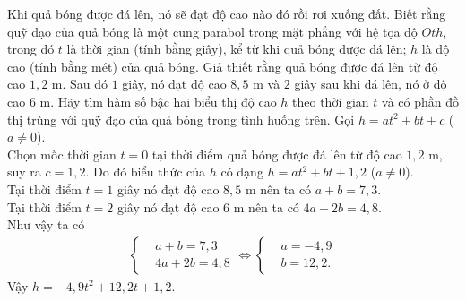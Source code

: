 \begin{vd}%
	Khi quả bóng được đá lên, nó sẽ đạt độ cao nào đó rồi rơi xuống đất. Biết rằng quỹ đạo của quả bóng là một cung parabol trong mặt phẳng với hệ tọa độ $Oth$, trong đó $t$ là thời gian (tính bằng giây), kể từ khi quả bóng được đá lên; $h$ là độ cao (tính bằng mét) của quả bóng. Giả thiết rằng quả bóng được đá lên từ độ cao $1{,}2$ m. Sau đó $1$ giây, nó đạt độ cao $8{,}5$ m và $2$ giây sau khi đá lên, nó ở độ cao $6$ m. Hãy tìm hàm số bậc hai biểu thị độ cao $h$ theo thời gian $t$ và có phần đồ thị trùng với quỹ đạo của quả bóng trong tình huống trên.
	\loigiai
	{
		Gọi $h=at^2+bt+c$ ($a\neq 0$).\\
		Chọn mốc thời gian $t=0$ tại thời điểm quả bóng được đá lên từ độ cao $1{,}2$ m, suy ra $c=1{,}2$. Do đó biểu thức của $h$ có dạng $h=at^2+bt+1{,}2$ ($a\neq 0$).\\
		Tại thời điểm $t=1$ giây nó đạt độ cao $8{,}5$ m nên ta có $a+b=7{,}3$.\\
		Tại thời điểm $t=2$ giây nó đạt độ cao $6$ m nên ta có $4a+2b=4{,}8$.\\
		Như vậy ta có
		\begin{eqnarray*}
			\left\{\begin{aligned}&a+b=7{,}3 \\&4a+2b=4{,}8\end{aligned}\right. \Leftrightarrow \left\{\begin{aligned}&a=-4{,}9 \\&b=12{,}2.  \end{aligned}\right.
		\end{eqnarray*}
		Vậy $h=-4{,}9t^2 + 12{,}2t + 1{,}2$.
	}
\end{vd} 

